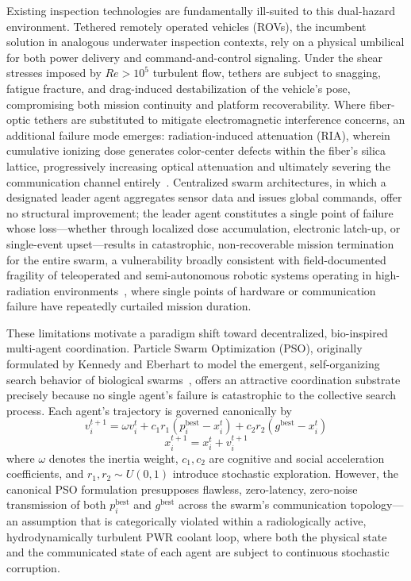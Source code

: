 \documentclass[journal]{IEEEtran}
\begin{document}
Existing inspection technologies are fundamentally ill-suited to this dual-hazard environment. Tethered remotely operated vehicles (ROVs), the incumbent solution in analogous underwater inspection contexts, rely on a physical umbilical for both power delivery and command-and-control signaling. Under the shear stresses imposed by $Re > 10^5$ turbulent flow, tethers are subject to snagging, fatigue fracture, and drag-induced destabilization of the vehicle's pose, compromising both mission continuity and platform recoverability. Where fiber-optic tethers are substituted to mitigate electromagnetic interference concerns, an additional failure mode emerges: radiation-induced attenuation (RIA), wherein cumulative ionizing dose generates color-center defects within the fiber's silica lattice, progressively increasing optical attenuation and ultimately severing the communication channel entirely~\cite{ria_optical}. Centralized swarm architectures, in which a designated leader agent aggregates sensor data and issues global commands, offer no structural improvement; the leader agent constitutes a single point of failure whose loss---whether through localized dose accumulation, electronic latch-up, or single-event upset---results in catastrophic, non-recoverable mission termination for the entire swarm, a vulnerability broadly consistent with field-documented fragility of teleoperated and semi-autonomous robotic systems operating in high-radiation environments~\cite{nagatani_fukushima,kawatsuma_robots}, where single points of hardware or communication failure have repeatedly curtailed mission duration.

These limitations motivate a paradigm shift toward decentralized, bio-inspired multi-agent coordination. Particle Swarm Optimization (PSO), originally formulated by Kennedy and Eberhart to model the emergent, self-organizing search behavior of biological swarms~\cite{pso_canonical}, offers an attractive coordination substrate precisely because no single agent's failure is catastrophic to the collective search process. Each agent's trajectory is governed canonically by
\begin{equation}
v_i^{t+1} = \omega v_i^{t} + c_1 r_1 \left(p_i^{\text{best}} - x_i^{t}\right) + c_2 r_2 \left(g^{\text{best}} - x_i^{t}\right)
\end{equation}
\begin{equation}
x_i^{t+1} = x_i^{t} + v_i^{t+1}
\end{equation}
where $\omega$ denotes the inertia weight, $c_1, c_2$ are cognitive and social acceleration coefficients, and $r_1, r_2 \sim U(0,1)$ introduce stochastic exploration. However, the canonical PSO formulation presupposes flawless, zero-latency, zero-noise transmission of both $p_i^{\text{best}}$ and $g^{\text{best}}$ across the swarm's communication topology---an assumption that is categorically violated within a radiologically active, hydrodynamically turbulent PWR coolant loop, where both the physical state and the communicated state of each agent are subject to continuous stochastic corruption.
\end{document}

